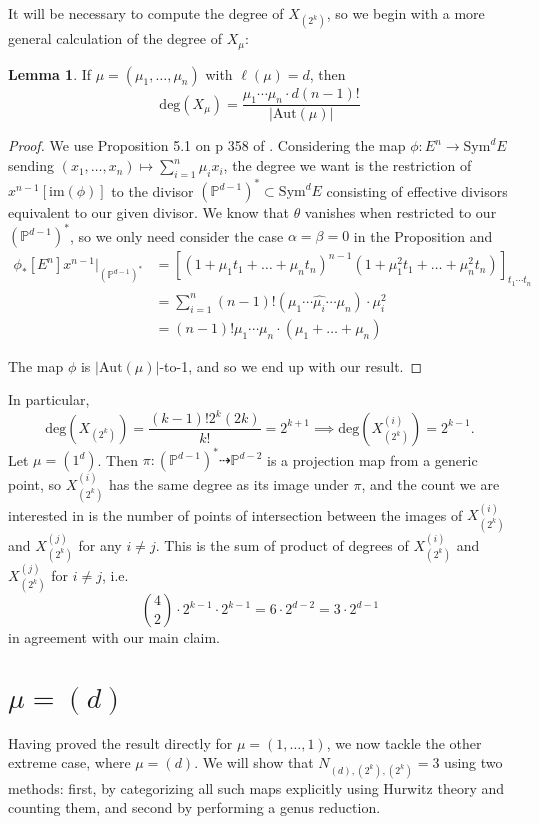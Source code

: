 \documentclass[thesis]{thesis-umich}           %
\newcommand{\Aut}{\text{Aut}}
\renewcommand{\P}{\mathbb P}
\theoremstyle{definition}
\newtheorem{lem}[thm]{Lemma}
\begin{document}
It will be necessary to compute the degree of $X_{(2^k)}$, so we begin with a more general calculation of the degree of $X_{\mu}$:

\begin{lem}
  \label{lemma:degree}
  If $\mu=(\mu_1,\dots,\mu_n)$ with $\ell(\mu)=d$, then
  \[
  \text{deg}(X_{\mu})=\frac{\mu_1\cdots\mu_n\cdot d(n-1)!}{|\text{Aut}(\mu)|}
  \]
\end{lem}

\begin{proof}
  We use Proposition 5.1 on p 358 of \cite{Harris}. Considering the map
  $\phi:E^n\to\text{Sym}^dE$ sending $(x_1,\dots,x_n)\mapsto \sum_{i=1}^n\mu_ix_i$,
  the degree we want is the restriction of $x^{n-1}[\text{im}(\phi)]$ to
  the divisor $(\P^{d-1})^*\subset\text{Sym}^dE$ consisting of effective divisors
  equivalent to our given divisor. We know that $\theta$ vanishes when
  restricted to our $(\P^{d-1})^*$, so we only need consider the case $\alpha=\beta=0$ in the Proposition and
  \begin{align*}
    \phi_*[E^n]x^{n-1}\bigg|_{(\P^{d-1})^*}&=[(1+\mu_1t_1+\dots+\mu_nt_n)^{n-1}(1+\mu_1^2t_1+\dots+\mu_n^2t_n)]_{t_1\cdots t_n}\\
    &=\sum_{i=1}^n(n-1)!(\mu_1\cdots\hat{\mu_i}\cdots \mu_n)\cdot\mu_i^2\\
    &=(n-1)!\mu_1\cdots\mu_n\cdot (\mu_1+\dots+\mu_n)
  \end{align*}

  
  The map $\phi$ is $|\Aut(\mu)|$-to-1, and so we end up with our result.
  \end{proof}
In particular,
\[
\text{deg}(X_{(2^k)})=\frac{(k-1)!2^k(2k)}{k!}=2^{k+1}\implies \text{deg}(X_{(2^k)}^{(i)})=2^{k-1}.
\]
Let $\mu=(1^{d})$. Then $\pi:(\P^{d-1})^*\dashrightarrow\P^{d-2}$ is
a projection map from a generic point, so $X_{(2^k)}^{(i)}$ has the same
degree as its image under $\pi$, and the count we are interested in is the
number of points of intersection between the images of $X_{(2^k)}^{(i)}$ and
$X_{(2^k)}^{(j)}$ for any $i\neq j$.
This is the sum of product of degrees of $X_{(2^k)}^{(i)}$ and $X_{(2^k)}^{(j)}$ for $i\neq j$, i.e.
\[
\binom 42\cdot 2^{k-1}\cdot 2^{k-1}=6\cdot 2^{d-2}=3\cdot 2^{d-1}
\]
in agreement with our main claim.


\section{$\mu=(d)$}

Having proved the result directly for $\mu=(1,\dots,1)$, we now tackle the other extreme case, where $\mu=(d)$. We will show that $N_{(d),(2^k),(2^k)}=3$
using two methods: first, by categorizing all such maps explicitly using Hurwitz theory and counting them, and second by performing a genus reduction.
\end{document}
